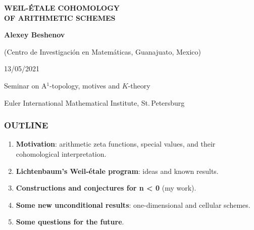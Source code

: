 \documentclass[handout]{beamer}
\begin{document}

\begin{frame}[noframenumbering]
  \begin{center}
    {\LARGE\bf WEIL-ÉTALE COHOMOLOGY \\
      OF ARITHMETIC SCHEMES

    }

    \vspace{3em}

    {\large\bf Alexey Beshenov}

    \vspace{1em}

    {\small (Centro de Investigación en Matemáticas, Guanajuato, Mexico)}

    \vspace{3em}

    13/05/2021

    \vspace{1em}

    Seminar on A${}^1$-topology, motives and $K$-theory

    Euler International Mathematical Institute, St.\,Petersburg

  \end{center}
\end{frame}


\begin{frame}
  \frametitle{OUTLINE}

  \begin{enumerate}
  \item<2->[I.] \textbf{Motivation}:
    arithmetic zeta functions,
    special values,
    and their cohomological interpretation.

  \item<3->[II.] \textbf{Lichtenbaum's Weil-étale program}:
    ideas and known results.

  \item<4->[III.] \textbf{Constructions and conjectures for n < 0}
    (my work).

  \item<5->[IV.] \textbf{Some new unconditional results}:
    one-dimensional and cellular schemes.

  \item<6->[V.] \textbf{Some questions for the future}.
  \end{enumerate}
\end{frame}
\end{document}
